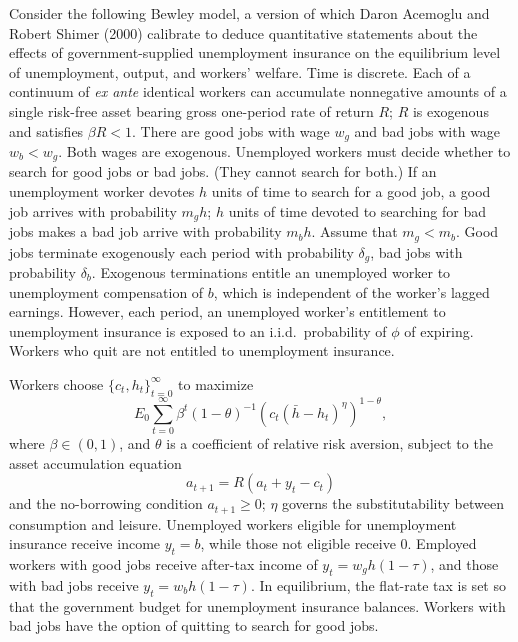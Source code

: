 \medskip
{} 
\medskip
\noindent
Consider the following Bewley model, a version of which Daron Acemoglu
and Robert Shimer (2000) calibrate to deduce quantitative statements
about the effects of government-supplied unemployment insurance on the
equilibrium level of unemployment, output, and workers' welfare.  Time
is discrete.  Each of a continuum of {\it {\it ex ante\/}\/} identical workers
can accumulate nonnegative amounts of a single risk-free asset bearing
gross one-period rate of return $R$; $R$ is exogenous and satisfies
$\beta R < 1$.  There are good jobs with wage $w_g$ and bad jobs with
wage $w_b< w_g$.  Both wages are exogenous.  Unemployed workers must decide
whether to search for good jobs or bad jobs.  (They cannot search for both.)
If an unemployment worker devotes $h$ units of time to search for a good job,
a good job arrives with probability $m_g h$; $h$ units of time devoted to
searching for bad jobs makes a bad job arrive with probability $ m_b h$.
Assume that $m_g < m_b$.  Good jobs terminate exogenously each period
with probability $\delta_g$, bad jobs with probability $\delta_b$.
Exogenous terminations entitle  an unemployed worker to unemployment
compensation of $b$, which is independent of the worker's lagged earnings.
However, each period, an unemployed worker's entitlement to unemployment
insurance is exposed to an i.i.d.\ probability of $\phi$ of expiring.
Workers who quit are not entitled to unemployment insurance.

Workers choose $\{c_t, h_t\}_{t=0}^\infty$ to maximize
$$ E_0 \sum_{t=0}^\infty \beta^t
(1-\theta)^{-1}(c_t (\bar h - h_t)^\eta)^{1-\theta},$$
where $\beta \in (0,1)$, and $\theta$ is a  coefficient of relative
risk aversion, subject to the asset accumulation equation
$$ a_{t+1} = R (a_t + y_t -  c_t) $$
and the no-borrowing condition $a_{t+1} \geq 0$; $\eta$ governs the
substitutability between consumption and leisure.  Unemployed workers
eligible for unemployment insurance receive income $y_t = b$, while those not eligible
receive $0$.  Employed workers with good jobs receive after-tax income
of $y_t = w_g h (1-\tau)$, and those with bad jobs receive
$y_t = w_b h(1-\tau)$.  In equilibrium,  the flat-rate tax is set so that
the government budget for unemployment insurance balances.  Workers with bad jobs have
the option of quitting to search for good jobs.


